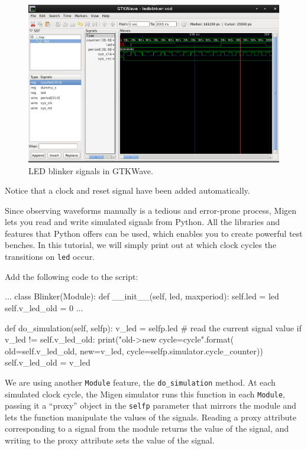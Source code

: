 \documentclass[11pt]{paper}
\begin{document}
\begin{figure}[h]
\centering
\includegraphics[width=\textwidth]{gtkwave.png}
\caption{LED blinker signals in GTKWave.}
\end{figure}

Notice that a clock and reset signal have been added automatically.

Since observing waveforms manually is a tedious and error-prone process, Migen lets you read and write simulated signals from Python. All the libraries and features that Python offers can be used, which enables you to create powerful test benches. In this tutorial, we will simply print out at which clock cycles the transitions on \verb!led! occur.

Add the following code to the script:
\begin{samepage}
\begin{verbatimtab}
...
class Blinker(Module):
	def __init__(self, led, maxperiod):
		self.led = led
		self.v_led_old = 0
		...

	def do_simulation(self, selfp):
		v_led = selfp.led # read the current signal value
		if v_led != self.v_led_old:
			print("{old}->{new} cycle={cycle}".format(
				old=self.v_led_old, new=v_led,
				cycle=selfp.simulator.cycle_counter))
			self.v_led_old = v_led
\end{verbatimtab}
\end{samepage}

We are using another \verb!Module! feature, the \verb!do_simulation! method. At each simulated clock cycle, the Migen simulator runs this function in each \verb!Module!, passing it a ``proxy'' object in the \verb!selfp! parameter that mirrors the module and lets the function manipulate the values of the signals. Reading a proxy attribute corresponding to a signal from the module returns the value of the signal, and writing to the proxy attribute sets the value of the signal.
\end{document}
